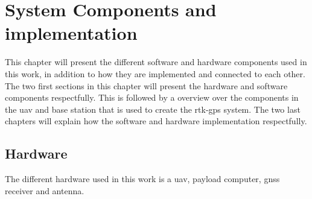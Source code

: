 
\chapter{System Components and implementation}
This chapter will present the different software and hardware components used in this work, in addition to how they are implemented and connected to each other. The two first sections in this chapter will present the hardware and software components respectfully. This is followed by a overview over the components in the \gls{uav} and base station that is used to create the \gls{rtk-gps} system. The two last chapters will explain how the software and hardware implementation respectfully.
\section{Hardware}
The different hardware used in this work is a \gls{uav}, payload computer, \gls{gnss} receiver and antenna.
